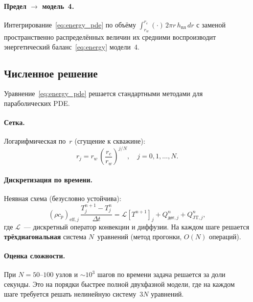 \documentclass[12pt,a4paper]{article}
\begin{document}
\paragraph{Предел $\to$ модель~4.}
Интегрирование~\eqref{eq:energy_pde} по объёму
$\int_{r_w}^{r_e} (\cdot)\,2\pi r\,h_{\text{пл}}\,dr$
с заменой пространственно распределённых величин их средними
воспроизводит энергетический баланс~\eqref{eq:energy} модели~4.

\subsection{Численное решение}

Уравнение~\eqref{eq:energy_pde} решается стандартными методами
для параболических PDE.

\paragraph{Сетка.}
Логарифмическая по~$r$ (сгущение к скважине):
\begin{equation}\label{eq:grid}
  r_j = r_w\,\left(\frac{r_e}{r_w}\right)^{j/N}, \quad j = 0, 1, \ldots, N.
\end{equation}

\paragraph{Дискретизация по времени.}
Неявная схема (безусловно устойчива):
\begin{equation}\label{eq:implicit}
  (\rho c_p)_{\mathrm{eff},j}\,\frac{T_j^{n+1} - T_j^n}{\Delta t}
  = \mathcal{L}[T^{n+1}]_j + Q_{\text{дег},j}^n + Q_{\mathrm{JT},j}^n,
\end{equation}
где $\mathcal{L}$~--- дискретный оператор конвекции и диффузии.
На каждом шаге решается \textbf{трёхдиагональная} система $N$~уравнений
(метод прогонки, $O(N)$ операций).

\paragraph{Оценка сложности.}
При $N = 50\text{--}100$ узлов и ${\sim}10^3$ шагов по времени задача
решается за доли секунды. Это на порядки быстрее полной двухфазной
модели, где на каждом шаге требуется решать нелинейную систему~$3N$
уравнений.
\end{document}

